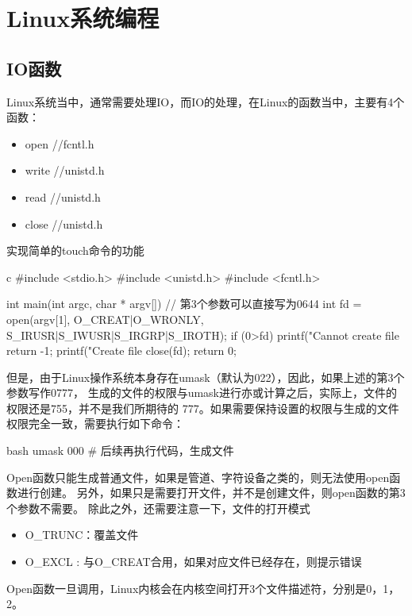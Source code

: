 \chapter{Linux系统编程}

\section{IO函数}
Linux系统当中，通常需要处理IO，而IO的处理，在Linux的函数当中，主要有4个函数：
\begin{itemize}
  \item open //fcntl.h
  \item write //unistd.h
  \item read //unistd.h
  \item close //unistd.h
\end{itemize}

实现简单的touch命令的功能
\begin{code-block}{c}
#include <stdio.h>
#include <unistd.h>
#include <fcntl.h>

int main(int argc, char * argv[])
{
        // 第3个参数可以直接写为0644
        int fd = open(argv[1], O_CREAT|O_WRONLY,
                S_IRUSR|S_IWUSR|S_IRGRP|S_IROTH);
        if (0>fd)
        {
                printf("Cannot create file %
                return -1;
        }
        printf("Create file %
        close(fd);
        return 0;
}
\end{code-block}

但是，由于Linux操作系统本身存在umask（默认为022），因此，如果上述的第3个参数写作0777，
生成的文件的权限与umask进行亦或计算之后，实际上，文件的权限还是755，并不是我们所期待的
777。如果需要保持设置的权限与生成的文件权限完全一致，需要执行如下命令：
\begin{code-block}{bash}
umask 000
# 后续再执行代码，生成文件
\end{code-block}

Open函数只能生成普通文件，如果是管道、字符设备之类的，则无法使用open函数进行创建。
另外，如果只是需要打开文件，并不是创建文件，则open函数的第3个参数不需要。
除此之外，还需要注意一下，文件的打开模式
\begin{itemize}
  \item O\_TRUNC：覆盖文件
  \item O\_EXCL : 与O\_CREAT合用，如果对应文件已经存在，则提示错误
\end{itemize}

Open函数一旦调用，Linux内核会在内核空间打开3个文件描述符，分别是0，1，2。

